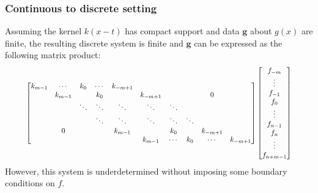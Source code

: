 \documentclass[t]{beamer}
\newcommand{\gVec}{\mathbf{g}}	%
\begin{document}
\begin{frame}
\frametitle{Continuous to discrete setting}
Assuming the kernel $k(x-t)$ has compact support and data $\gVec$ about $g(x)$ are finite, the resulting discrete system is finite and $\gVec$ can be expressed as the following matrix product:
\[\resizebox{.9 \textwidth}{!}{$
\begin{bmatrix}
k_{m-1} & \cdots & k_0 & \cdots & k_{-m+1} & & & & & \\
 & k_{m-1} & & k_0 & & k_{-m+1} & & & 0 & \\
 & & \ddots & \ddots & \ddots & \ddots & \ddots & & & \\
 & & & \ddots & \ddots & \ddots & \ddots & \ddots & & \\
 & 0 & & & k_{m-1} & & k_0 & & k_{-m+1} & \\
 & & & & & k_{m-1} & \cdots & k_0 & \cdots & k_{-m+1}
\end{bmatrix}\begin{bmatrix}
f_{-m} \\
\vdots \\
f_{-1} \\
f_0 \\
\vdots \\
f_{n-1} \\
f_n \\
\vdots \\
f_{n+m-1}
\end{bmatrix}$}\]
However, this system is underdetermined without imposing some boundary conditions on $f$.
\end{frame}
\end{document}
